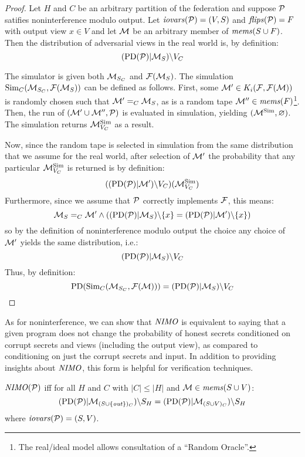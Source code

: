 \begin{proof}
  Let $H$ and $C$ be an arbitrary partition of the federation and
  suppose $\mathcal{P}$ satifies noninterference modulo output. Let
  $\mathit{iovars}(\mathcal{P}) = (V,S)$ and $\mathit{flips}(\mathcal{P}) = F$ with output view $x
  \in V$ and let $\mathcal{M}$ be an arbitrary member of $\mathit{mems}(S \cup
  F)$. Then the distribution of adversarial views in the real world
  is, by definition:
  $$(\mathrm{PD}(\mathcal{P})|\mathcal{M}_S)\backslash V_C$$

  The simulator is given both $\mathcal{M}_{S_C}$ and
  $\mathcal{F}(\mathcal{M}_S)$.  The simulation $\mathrm{Sim}_C(\mathcal{M}_{S_C},
  \mathcal{F}(\mathcal{M}_S))$ can be defined as follows. First, some $\mathcal{M}'
  \in K_i(\mathcal{F},\mathcal{F}(\mathcal{M}))$ is randomly chosen such that
  $\mathcal{M}' =_C \mathcal{M}_S$, as is a random tape $\mathcal{M}'' \in
  \mathit{mems}(F)$\footnote{The real/ideal model allows consultation of a
  ``Random Oracle''.}. Then, the run of $(\mathcal{M}' \cup \mathcal{M}'',
  \mathcal{P})$ is evaluated in simulation, yielding $(\mathcal{M}^{\mathrm{Sim}},\varnothing)$.
  The simulation returns $\mathcal{M}^{\mathrm{Sim}}_{V_C}$ as a result.

  Now, since the random tape is selected in simulation from the same distribution
  that we assume for the real world, after selection of $\mathcal{M}'$ the
  probability that any particular $\mathcal{M}^{\mathrm{Sim}}_{V_C}$ is returned is by definition:
  $$
   ((\mathrm{PD}(\mathcal{P})|\mathcal{M}')\backslash V_C)(\mathcal{M}^{\mathrm{Sim}}_{V_C})
  $$
  Furthermore, since we assume that $\mathcal{P}$ correctly implements $\mathcal{F}$, this
  means:
  $$
  \mathcal{M}_S =_C \mathcal{M}' \wedge
     ((\mathrm{PD}(\mathcal{P})|\mathcal{M}_S)\backslash\{ x \} =
      (\mathrm{PD}(\mathcal{P})|\mathcal{M}')\backslash\{ x \})
  $$
  so by the definition of noninterference modulo output the choice
  any choice of $\mathcal{M}'$ yields the same distribution, i.e.:
  $$(\mathrm{PD}(\mathcal{P})|\mathcal{M}_S)\backslash V_C$$
  Thus, by definition:
  $$
   \mathrm{PD}(\mathrm{Sim}_C(\mathcal{M}_{S_C},\mathcal{F}(\mathcal{M}))) = (\mathrm{PD}(\mathcal{P})|\mathcal{M}_S)\backslash V_C
  $$
\end{proof}

As for noninterference, we can show that $\mathit{NIMO}$ is equivalent
to saying that a given program does not change the probability
of honest secrets conditioned on corrupt secrets and views
(including the output view), as compared to conditioning on
just the corrupt secrets and input. In addition to providing
insights about $\mathit{NIMO}$, this form is helpful for
verification techniques. 
\begin{lemma}
  $\mathit{NIMO}(\mathcal{P})$ iff for all $H$ and $C$ with $|C| \le |H|$ and
  $\mathcal{M} \in \mathit{mems}(S \cup V)$:
  $$(\mathrm{PD}(\mathcal{P})|\mathcal{M}_{(S \cup \{\mathit{out}\})_C})\backslash S_H =
  (\mathrm{PD}(\mathcal{P})|\mathcal{M}_{(S\cup V)_C})\backslash S_H $$
  where  $\mathit{iovars}(\mathcal{P}) = (S,V)$.
\end{lemma}
